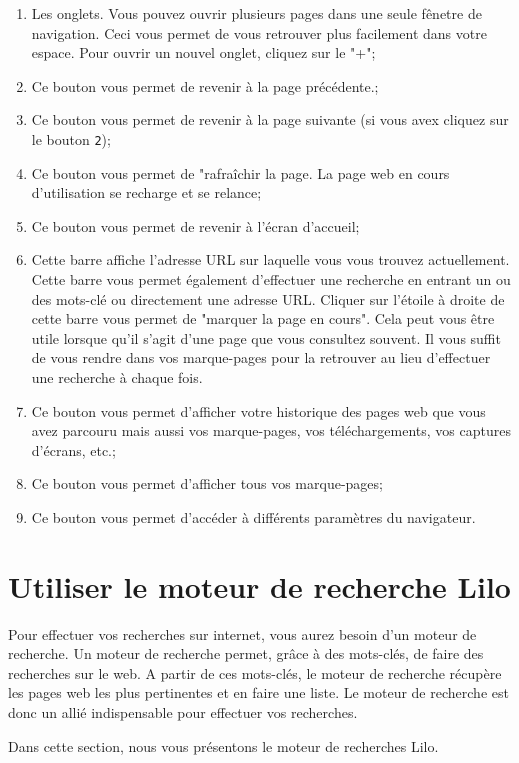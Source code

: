 \documentclass[12pt]{book}
\begin{document}
	\begin{enumerate}
		\item Les onglets.\newline
				Vous pouvez ouvrir plusieurs pages dans une seule fênetre de navigation.
				Ceci vous permet de vous retrouver plus facilement dans votre espace.
				Pour ouvrir un nouvel onglet, cliquez sur le "+";
		\item Ce bouton vous permet de revenir à la page précédente.;
		\item Ce bouton vous permet de revenir à la page suivante (si vous avex cliquez sur le bouton \texttt{2});
		\item Ce bouton vous permet de "rafraîchir la page.
				La page web en cours d'utilisation se recharge et se relance;
		\item Ce bouton vous permet de revenir à l'écran d'accueil;
		\item Cette barre affiche l'adresse URL sur laquelle vous vous trouvez actuellement.
				Cette barre vous permet également d'effectuer une recherche en entrant un ou des mots-clé ou directement une adresse URL.
				Cliquer sur l'étoile à droite de cette barre vous permet de "marquer la page en cours".
				Cela peut vous être utile lorsque qu'il s'agit d'une page que vous consultez souvent.
				Il vous suffit de vous rendre dans vos marque-pages pour la retrouver au lieu d'effectuer une recherche à chaque fois.
		\item Ce bouton vous permet d'afficher votre historique des pages web que vous avez parcouru mais aussi vos marque-pages, vos téléchargements, vos captures d'écrans, etc.;
		\item Ce bouton vous permet d'afficher tous vos marque-pages;
		\item Ce bouton vous permet d'accéder à différents paramètres du navigateur.
	\end{enumerate}
\section{Utiliser le moteur de recherche Lilo}\label{sec:lilo}
	Pour effectuer vos recherches sur internet, vous aurez besoin d'un moteur de recherche.
	Un moteur de recherche permet, grâce à des mots-clés, de faire des recherches sur le web.
	A partir de ces mots-clés, le moteur de recherche récupère les pages web les plus pertinentes et en faire une liste.
	Le moteur de recherche est donc un allié indispensable pour effectuer vos recherches.\par
	Dans cette section, nous vous présentons le moteur de recherches Lilo.
\end{document}
